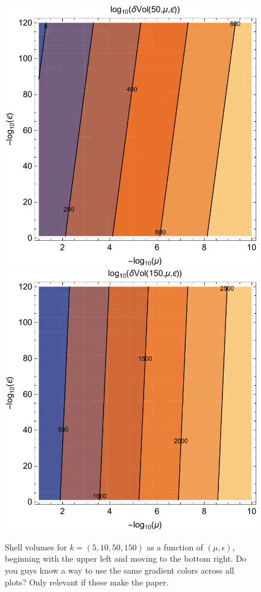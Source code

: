 \documentclass[a4paper,11pt]{article}
\newcommand{\jh}[1]{{\color{blue}  #1}}
\begin{document}
\begin{figure}
\includegraphics[scale=.6]{dvolk50}
\includegraphics[scale=.6]{dvolk150} 
\caption{Shell volumes for $k=(5,10,50,150)$ as a function of $(\mu,\epsilon)$, beginning with the upper left and moving to the bottom right. \jh{Do you guys know
a way to use the same gradient colors across all plots? Only relevant if
these make the paper.}}
\label{fig:dvols}
\end{figure}
\end{document}
